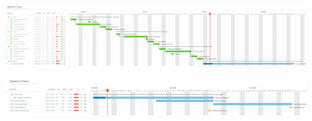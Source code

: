 \documentclass[titlepage,12pt]{report}
\begin{document}
\begin{appendices}
\begin{figure}[H]
	\centering
  	\includegraphics[scale=0.25]{media/gantt_dev_eng_new.png}
  	\label{gantt_3}
\end{figure}

\begin{figure}[H]
	\centering
  	\includegraphics[scale=0.25]{media/gantt_final_eng.png}
  	\label{gantt_4}
\end{figure}

\useportrait

\end{appendices}

\listoffigures

\listoftables
\end{document}
